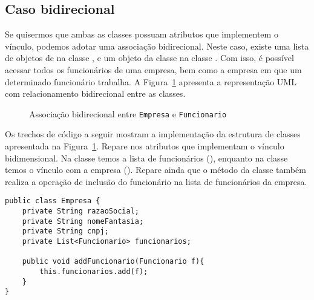 \subsection{Caso bidirecional}

Se quisermos que ambas as classes possuam atributos que implementem o vínculo, podemos adotar uma associação bidirecional. Neste caso, existe uma lista de objetos de  na classe , e um objeto da classe  na classe . Com isso, é possível acessar todos os funcionários de uma empresa, bem como a empresa em que um determinado funcionário trabalha. A Figura~\ref{fig:associacao-bidirecional-empresa} apresenta a representação UML com relacionamento bidirecional entre as classes.

\begin{figure}[h]
	\centering
	
	
	\caption{Associação bidirecional entre \texttt{Empresa} e \texttt{Funcionario}}
	\label{fig:associacao-bidirecional-empresa}
\end{figure}
 
Os trechos de código a seguir mostram a implementação da estrutura de classes apresentada na Figura~\ref{fig:associacao-bidirecional-empresa}. Repare nos atributos que implementam o vínculo bidimensional. Na classe  temos a lista de funcionários (), enquanto na classe  temos o vínculo com a empresa (). Repare ainda que o método  da classe  também realiza a operação de inclusão do funcionário na lista de funcionários da empresa.

\begin{verbatim}
public class Empresa {
	private String razaoSocial;
	private String nomeFantasia;
	private String cnpj;
	private List<Funcionario> funcionarios;
	
	public void addFuncionario(Funcionario f){
		this.funcionarios.add(f);
	}
}
\end{verbatim}

